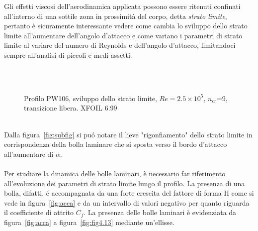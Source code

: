 Gli effetti viscosi dell'aerodinamica applicata possono essere ritenuti confinati all'interno di una sottile zona in prossimità del corpo, detta \emph{strato limite}, pertanto è sicuramente interessante vedere come cambia lo sviluppo dello strato limite all'aumentare dell'angolo d'attacco e come variano i parametri di strato limite al variare del numero di Reynolds e dell'angolo d'attacco, limitandoci sempre all'analisi di piccoli e medi assetti.\\
\begin{figure}[H]
\centering
{} \\
 \\
\caption{\footnotesize Profilo PW106, sviluppo dello strato limite, $Re=2.5\times10^5$, $n_{cr}$=9, transizione libera. XFOIL 6.99}
\label{fig:subfig}
\end{figure}


\noindent \\

Dalla figura~\vref{fig:subfig} si puó notare il lieve "rigonfiamento" dello strato limite in corrispondenza della bolla laminare che si sposta verso il bordo d'attacco all'aumentare di ${\alpha}$.\\ \\
Per studiare la dinamica delle bolle laminari, è necessario far riferimento all'evoluzione dei parametri di strato limite lungo il profilo. La presenza di una bolla, difatti, é accompagnata da una forte crescita del fattore di forma H come si vede in figura~\vref{fig:acca} e da un intervallo di valori negativo per quanto riguarda il coefficiente di attrito   $C_f$. La presenza delle bolle laminari è evidenziata da figura~\vref{fig:acca} a  figura~\vref{fig:fig4.13} mediante un'ellisse.

